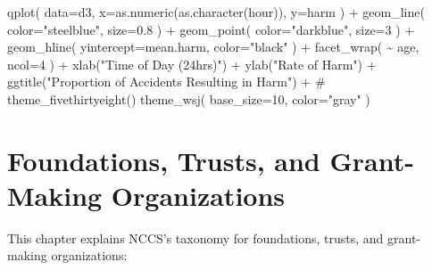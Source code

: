 \documentclass[
  letterpaper,
  DIV=11,
  numbers=noendperiod]{scrreprt}
\newenvironment{Shaded}{\begin{snugshade}}{\end{snugshade}}
\newcommand{\AttributeTok}[1]{\textcolor[rgb]{0.40,0.45,0.13}{#1}}
\newcommand{\CommentTok}[1]{\textcolor[rgb]{0.37,0.37,0.37}{#1}}
\newcommand{\DecValTok}[1]{\textcolor[rgb]{0.68,0.00,0.00}{#1}}
\newcommand{\FloatTok}[1]{\textcolor[rgb]{0.68,0.00,0.00}{#1}}
\newcommand{\FunctionTok}[1]{\textcolor[rgb]{0.28,0.35,0.67}{#1}}
\newcommand{\NormalTok}[1]{\textcolor[rgb]{0.00,0.23,0.31}{#1}}
\newcommand{\SpecialCharTok}[1]{\textcolor[rgb]{0.37,0.37,0.37}{#1}}
\newcommand{\StringTok}[1]{\textcolor[rgb]{0.13,0.47,0.30}{#1}}
\begin{document}
\begin{Shaded}
\begin{Highlighting}[]
\FunctionTok{qplot}\NormalTok{( }\AttributeTok{data=}\NormalTok{d3, }\AttributeTok{x=}\FunctionTok{as.numeric}\NormalTok{(}\FunctionTok{as.character}\NormalTok{(hour)), }\AttributeTok{y=}\NormalTok{harm ) }\SpecialCharTok{+} 
  \FunctionTok{geom\_line}\NormalTok{( }\AttributeTok{color=}\StringTok{"steelblue"}\NormalTok{, }\AttributeTok{size=}\FloatTok{0.8}\NormalTok{ ) }\SpecialCharTok{+} 
  \FunctionTok{geom\_point}\NormalTok{( }\AttributeTok{color=}\StringTok{"darkblue"}\NormalTok{, }\AttributeTok{size=}\DecValTok{3}\NormalTok{ ) }\SpecialCharTok{+} 
  \FunctionTok{geom\_hline}\NormalTok{( }\AttributeTok{yintercept=}\NormalTok{mean.harm, }\AttributeTok{color=}\StringTok{"black"}\NormalTok{ ) }\SpecialCharTok{+} 
  \FunctionTok{facet\_wrap}\NormalTok{( }\SpecialCharTok{\textasciitilde{}}\NormalTok{ age, }\AttributeTok{ncol=}\DecValTok{4}\NormalTok{ ) }\SpecialCharTok{+} 
  \FunctionTok{xlab}\NormalTok{(}\StringTok{"Time of Day (24hrs)"}\NormalTok{) }\SpecialCharTok{+} \FunctionTok{ylab}\NormalTok{(}\StringTok{"Rate of Harm"}\NormalTok{) }\SpecialCharTok{+}
  \FunctionTok{ggtitle}\NormalTok{(}\StringTok{"Proportion of Accidents Resulting in Harm"}\NormalTok{) }\SpecialCharTok{+}
  \CommentTok{\# theme\_fivethirtyeight() }
  \FunctionTok{theme\_wsj}\NormalTok{( }\AttributeTok{base\_size=}\DecValTok{10}\NormalTok{, }\AttributeTok{color=}\StringTok{"gray"}\NormalTok{ )}
\end{Highlighting}
\end{Shaded}


\hypertarget{foundations-trusts-and-grant-making-organizations}{%
\chapter{Foundations, Trusts, and Grant-Making
Organizations}\label{foundations-trusts-and-grant-making-organizations}}

This chapter explains NCCS's taxonomy for foundations, trusts, and
grant-making organizations:
\end{document}
